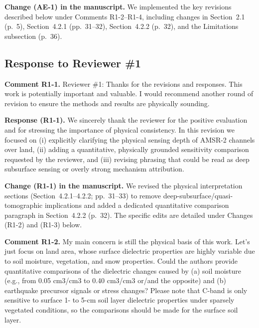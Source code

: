 \documentclass[11pt]{article}
\newcommand{\revcomment}[1]{\begingroup\color{commentcolor}#1\endgroup}
\newcommand{\revresponse}[1]{\begingroup\color{responsecolor}#1\endgroup}
\newcommand{\revchange}[1]{\begingroup\color{changecolor}#1\endgroup}
\begin{document}
\revchange{%
\textbf{Change (AE-1) in the manuscript.}
We implemented the key revisions described below under Comments R1-2--R1-4, including changes in Section~2.1 (p.~5), Section~4.2.1 (pp.~31--32), Section~4.2.2 (p.~32), and the Limitations subsection (p.~36).
}

\bigskip

\subsection*{Response to Reviewer \#1}

\revcomment{%
\textbf{Comment R1-1.}
Reviewer \#1: Thanks for the revisions and responses. This work is potentially important and valuable. I would recommend another round of revision to ensure the methods and results are physically sounding.
}

\revresponse{%
\textbf{Response (R1-1).}
We sincerely thank the reviewer for the positive evaluation and for stressing the importance of physical consistency. In this revision we focused on (i) explicitly clarifying the physical sensing depth of AMSR-2 channels over land, (ii) adding a quantitative, physically grounded sensitivity comparison requested by the reviewer, and (iii) revising phrasing that could be read as deep subsurface sensing or overly strong mechanism attribution.
}

\revchange{%
\textbf{Change (R1-1) in the manuscript.}
We revised the physical interpretation sections (Section~4.2.1--4.2.2; pp.~31--33) to remove deep-subsurface/quasi-tomographic implications and added a dedicated quantitative comparison paragraph in Section~4.2.2 (p.~32). The specific edits are detailed under Changes (R1-2) and (R1-3) below.
}

\bigskip

\revcomment{%
\textbf{Comment R1-2.}
My main concern is still the physical basis of this work. Let's just focus on land area, whose surface dielectric properties are highly variable due to soil moisture, vegetation, and snow properties. Could the authors provide quantitative comparisons of the dielectric changes caused by (a) soil moisture (e.g., from 0.05 cm3/cm3 to 0.40 cm3/cm3 or/and the opposite) and (b) earthquake precursor signals or stress changes? Please note that C-band is only sensitive to surface 1- to 5-cm soil layer dielectric properties under sparsely vegetated conditions, so the comparisons should be made for the surface soil layer.
}
\end{document}
